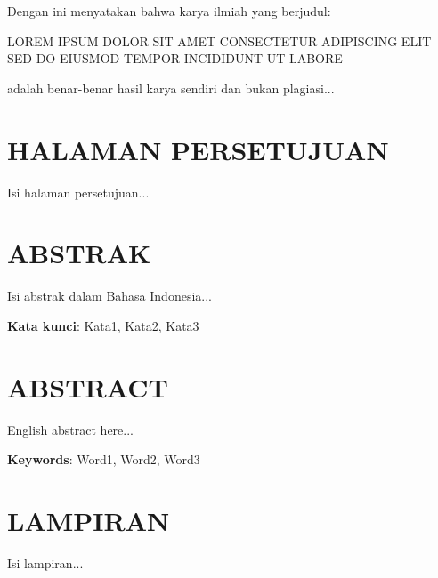 \documentclass[12pt, a4paper, onecolumn, oneside]{report}
\newcommand{\judul}{LOREM IPSUM DOLOR SIT AMET CONSECTETUR ADIPISCING ELIT SED DO EIUSMOD TEMPOR INCIDIDUNT UT LABORE}
\begin{document}
Dengan ini menyatakan bahwa karya ilmiah yang berjudul:

\judul

adalah benar-benar hasil karya sendiri dan bukan plagiasi...

\cleardoublepage
\chapter*{HALAMAN PERSETUJUAN}
Isi halaman persetujuan...

\cleardoublepage
\chapter*{ABSTRAK}
Isi abstrak dalam Bahasa Indonesia...

\vspace{1cm}
\textbf{Kata kunci}: Kata1, Kata2, Kata3

\cleardoublepage
\chapter*{ABSTRACT}
English abstract here...

\vspace{1cm}
\textbf{Keywords}: Word1, Word2, Word3

\cleardoublepage
\tableofcontents
\cleardoublepage
\listoffigures
\cleardoublepage
\listoftables

\cleardoublepage

\cleardoublepage

\cleardoublepage

\cleardoublepage

\cleardoublepage


\cleardoublepage



\cleardoublepage
\appendix
\chapter*{LAMPIRAN}
Isi lampiran...
\end{document}
